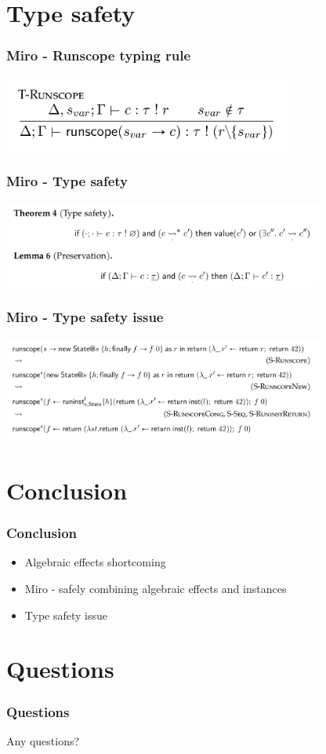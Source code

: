 \documentclass{beamer}
\begin{document}
\section{Type safety}

\begin{frame}[fragile]\frametitle{Miro - Runscope typing rule}
\begin{center}
\includegraphics[width=270pt]{images/typing-rule.png}
\end{center}
\end{frame}

\begin{frame}[fragile]\frametitle{Miro - Type safety}
\begin{center}
\includegraphics[width=300pt]{images/type-safety.png}
\end{center}
\end{frame}

\begin{frame}[fragile]\frametitle{Miro - Type safety issue}
\begin{center}
\includegraphics[width=300pt]{images/counter-example.png}
\end{center}
\end{frame}

\section{Conclusion}

\begin{frame}[fragile]\frametitle{Conclusion}
\begin{itemize}
\item Algebraic effects shortcoming
\item Miro - safely combining algebraic effects and instances
\item Type safety issue
\end{itemize}
\end{frame}

\section{Questions}

\begin{frame}[fragile]\frametitle{Questions}
Any questions?
\end{frame}
\end{document}

